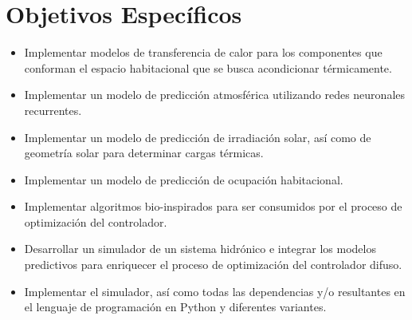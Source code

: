 \section{Objetivos Específicos}

\begin{itemize}
	\item Implementar modelos de transferencia de calor para los componentes que conforman el espacio habitacional que se busca acondicionar térmicamente.
	\item Implementar un modelo de predicción atmosférica utilizando redes neuronales recurrentes.
	\item Implementar un modelo de predicción de irradiación solar, así como de geometría solar para determinar cargas térmicas.
	\item Implementar un modelo de predicción de ocupación habitacional.
	\item Implementar algoritmos bio-inspirados para ser consumidos por el proceso de optimización del controlador.
	\item Desarrollar un simulador de un sistema hidrónico e integrar los modelos predictivos para enriquecer el proceso de optimización del controlador difuso.
	\item Implementar el simulador, así como todas las dependencias y/o resultantes en el lenguaje de programación en Python y diferentes variantes.
\end{itemize}